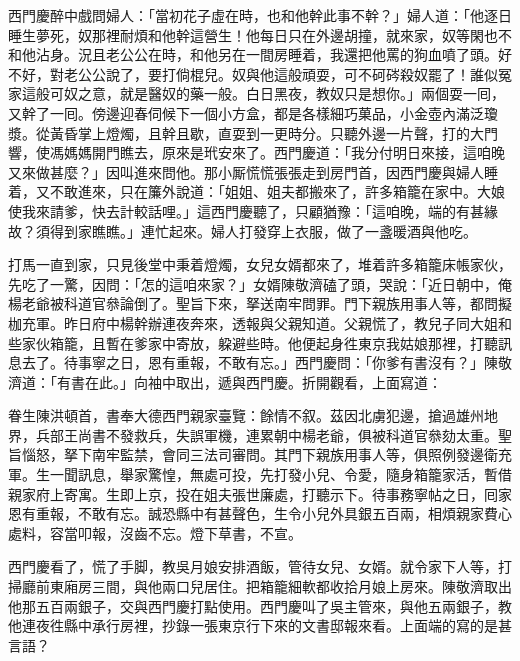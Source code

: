 西門慶醉中戲問婦人：「當初花子虛在時，也和他幹此事不幹？」婦人道：「他逐日睡生夢死，奴那裡耐煩和他幹這營生！他每日只在外邊胡撞，就來家，奴等閑也不和他沾身。況且老公公在時，和他另在一間房睡着，我還把他罵的狗血噴了頭。好不好，對老公公說了，{}要打倘棍兒。奴與他這般頑耍，可不砢硶殺奴罷了！誰似冤家這般可奴之意，就是醫奴的藥一般。白日黑夜，教奴只是想你。」兩個耍一囘，又幹了一囘。傍邊迎春伺候下一個小方盒，都是各樣細巧菓品，小金壺內滿泛瓊漿。從黃昏掌上燈燭，且幹且歇，直耍到一更時分。只聽外邊一片聲，打的大門響，使馮媽媽開門瞧去，原來是玳安來了。西門慶道：「我分付明日來接，這咱晚又來做甚麼？」因叫進來問他。那小厮慌慌張張走到房門首，因西門慶與婦人睡着，又不敢進來，只在簾外說道：「姐姐、姐夫都搬來了，許多箱籠在家中。大娘使我來請爹，快去計較話哩。」這西門慶聽了，只顧猶豫：「這咱晚，端的有甚緣故？須得到家瞧瞧。」連忙起來。婦人打發穿上衣服，做了一盞暖酒與他吃。

打馬一直到家，只見後堂中秉着燈燭，女兒女婿都來了，堆着許多箱籠床帳家伙，先吃了一驚，因問：「怎的這咱來家？」女婿陳敬濟磕了頭，哭說：「近日朝中，俺楊老爺被科道官叅論倒了。聖旨下來，拏送南牢問罪。門下親族用事人等，都問擬枷充軍。昨日府中楊幹辦連夜奔來，透報與父親知道。父親慌了，教兒子同大姐和些家伙箱籠，且暫在爹家中寄放，躱避些時。他便起身徃東京我姑娘那裡，打聽訊息去了。待事寧之日，恩有重報，不敢有忘。」西門慶問：「你爹有書沒有？」陳敬濟道：「有書在此。」向袖中取出，遞與西門慶。折開觀看，上面寫道：

\begin{myquote}[\markfont]
眷生陳洪頓首，書奉大德西門親家臺覽：餘情不叙。茲因北虜犯邊，搶過雄州地界，兵部王尚書不發救兵，失誤軍機，連累朝中楊老爺，{}俱被科道官叅劾太重。聖旨惱怒，拏下南牢監禁，會同三法司審問。其門下親族用事人等，俱照例發邊衛充軍。生一聞訊息，舉家驚惶，無處可投，先打發小兒、令愛，隨身箱籠家活，暫借親家府上寄寓。生即上京，投在姐夫張世廉處，打聽示下。待事務寧帖之日，囘家恩有重報，不敢有忘。誠恐縣中有甚聲色，{}生令小兒外具銀五百兩，相煩親家費心處料，容當叩報，沒齒不忘。燈下草書，不宣。

\end{myquote}

西門慶看了，慌了手脚，教吳月娘安排酒飯，管待女兒、女婿。就令家下人等，打掃廳前東廂房三間，與他兩口兒居住。把箱籠細軟都收拾月娘上房來。{}陳敬濟取出他那五百兩銀子，交與西門慶打點使用。西門慶叫了吳主管來，與他五兩銀子，教他連夜徃縣中承行房裡，抄錄一張東京行下來的文書邸報來看。上面端的寫的是甚言語？

